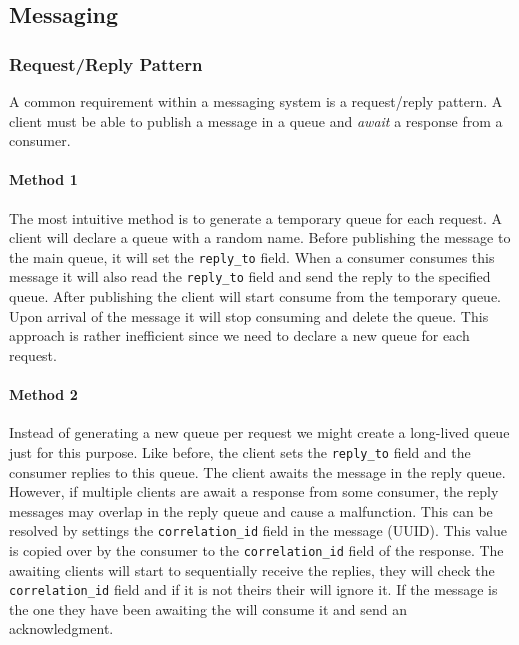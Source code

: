 \documentclass[../documentation.tex]{subfiles}
\begin{document}
\pagebreak

\subsection{Messaging}

\subsubsection{Request/Reply Pattern}

A common requirement within a messaging system is a request/reply pattern.
A client must be able to publish a message in a queue and \textit{await}
a response from a consumer.

\paragraph{Method 1} The most intuitive method is to generate a temporary queue for each request.
A client will declare a queue with a random name. Before publishing the message to the main queue,
it will set the \texttt{reply\_to} field. When a consumer consumes this message it will also read the
\texttt{reply\_to} field and send the reply to the specified queue. After publishing the client will start consume
from the temporary queue. Upon arrival of the message it will stop consuming and delete the queue.
This approach is rather inefficient since we need to declare a new queue for each request.

\paragraph{Method 2} Instead of generating a new queue per request we might create a long-lived queue
just for this purpose. Like before, the client sets the \texttt{reply\_to} field and the consumer replies
to this queue. The client awaits the message in the reply queue. However, if multiple clients
are await a response from some consumer, the reply messages may overlap in the reply queue and cause a malfunction.
This can be resolved by settings the \texttt{correlation\_id} field in the message (UUID). This value is copied
over by the consumer to the \texttt{correlation\_id} field of the response. The awaiting clients will start to
sequentially receive the replies, they will check the \texttt{correlation\_id} field and if it is not theirs
their will ignore it. If the message is the one they have been awaiting the will consume it and send an acknowledgment.
\end{document}
